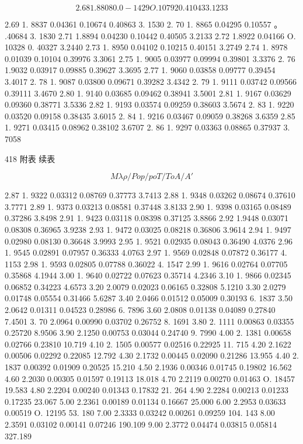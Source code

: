 \[2.68 1. 8808 0.0 -1429 O. 10792 0.41043 3. 1233\]

2.69 1. 8837 0.04361 0.10674 0.40863 3. 1530 2. 70 1. 8865 0.04295 0.10557 。 .40684 3. 1830 2.71 1.8894 0.04230 0.10442 0.40505 3.2133 2.72 1.8922 0.04166 O. 10328 0. 40327 3.2440 2.73 1. 8950 0.04102 0.10215 0.40151 3.2749 2.74 1. 8978 0.01039 0.10104 0.39976 3.3061 2.75 1. 9005 0.03977 0.09994 0.39801 3.3376 2. 76 1.9032 0.03917 0.09885 0.39627 3.3695 2.77 1. 9060 0.03858 0.09777 0.39454 3.4017 2. 78 1. 9087 0.03800 0.09671 0.39282 3.4342 2. 79 1. 9111 0.03742 0.09566 0.39111 3.4670 2.80 1. 9140 0.03685 0.09462 0.38941 3.5001 2.81 1. 9167 0.03629 0.09360 0.38771 3.5336 2.82 1. 9193 0.03574 0.09259 0.38603 3.5674 2. 83 1. 9220 0.03520 0.09158 0.38435 3.6015 2. 84 1. 9216 0.03467 0.09059 0.38268 3.6359 2.85 1. 9271 0.03415 0.08962 0.38102 3.6707 2. 86 1. 9297 0.03363 0.08865 0.37937 3. 7058

418 附表 续表

\[M \lambda  \rho  / Po p/po T/To A/A'\]

2.87 1. 9322 0.03312 0.08769 0.37773 3.7413 2.88 1. 9348 0.03262 0.08674 0.37610 3.7771 2.89 1. 9373 0.03213 0.08581 0.37448 3.8133 2.90 1. 9398 0.03165 0.08489 0.37286 3.8498 2.91 1. 9423 0.03118 0.08398 0.37125 3.8866 2.92 1.9448 0.03071 0.08308 0.36965 3.9238 2.93 1. 9472 0.03025 0.08218 0.36806 3.9614 2.94 1. 9497 0.02980 0.08130 0.36648 3.9993 2.95 1. 9521 0.02935 0.08043 0.36490 4.0376 2.96 1. 9545 0.02891 0.07957 0.36333 4.0763 2.97 1. 9569 0.02848 0.07872 0.36177 4. 1153 2.98 1. 9593 0.02805 0.07788 0.36022 4. 1547 2.99 1. 9616 0.02764 0.07705 0.35868 4.1944 3.00 1. 9640 0.02722 0.07623 0.35714 4.2346 3.10 1. 9866 0.02345 0.06852 0.34223 4.6573 3.20 2.0079 0.02023 0.06165 0.32808 5.1210 3.30 2.0279 0.01748 0.05554 0.31466 5.6287 3.40 2.0466 0.01512 0.05009 0.30193 6. 1837 3.50 2.0642 0.01311 0.04523 0.28986 6. 7896 3.60 2.0808 0.01138 0.04089 0.27840 7.4501 3. 70 2.0964 0.00990 0.03702 0.26752 8. 1691 3.80 2. 1111 0.00863 0.03355 0.25720 8.9506 3.90 2.1250 0.00753 0.03044 0.24740 9. 7990 4.00 2. 1381 0.00658 0.02766 0.23810 10.719 4.10 2. 1505 0.00577 0.02516 0.22925 11. 715 4.20 2.1622 0.00506 0.02292 0.22085 12.792 4.30 2.1732 0.00445 0.02090 0.21286 13.955 4.40 2. 1837 0.00392 0.01909 0.20525 15.210 4.50 2.1936 0.00346 0.01745 0.19802 16.562 4.60 2.2030 0.00305 0.01597 0.19113 18.018 4.70 2.2119 0.00270 0.01463 O. 18457 19.583 4.80 2.2204 0.00240 0.01343 0.17832 21. 264 4.90 2.2284 0.00213 0.01233 0.17235 23.067 5.00 2.2361 0.00189 0.01134 0.16667 25.000 6.00 2.2953 0.03633 0.00519 O. 12195 53. 180 7.00 2.3333 0.03242 0.00261 0.09259 104. 143 8.00 2.3591 0.03102 0.00141 0.07246 190.109 9.00 2.3772 0.04474 0.03815 0.05814 327.189


